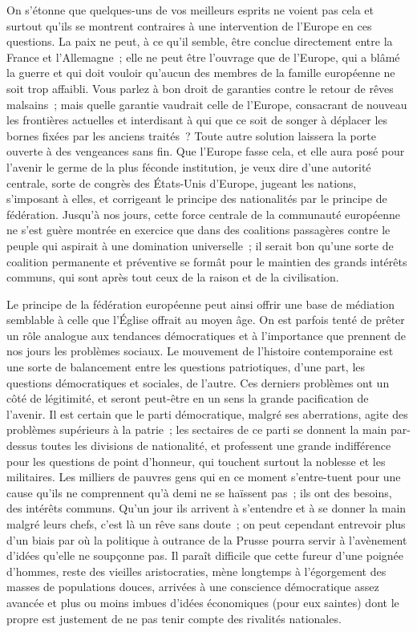 \documentclass[french,twoside]{book} %
\begin{document}
On s’étonne que quelques-uns de vos meilleurs esprits ne voient pas cela et surtout qu’ils se montrent contraires à une intervention de l’Europe en ces questions. La paix ne peut, à ce qu’il semble, être conclue directement entre la France et l’Allemagne ; elle ne peut être l’ouvrage que de l’Europe, qui a blâmé la guerre et qui doit vouloir qu’aucun des membres de la famille européenne ne soit trop affaibli. Vous parlez à bon droit de garanties contre le retour de rêves malsains ; mais quelle garantie vaudrait celle de l’Europe, consacrant de nouveau les frontières actuelles et interdisant à qui que ce soit de songer à déplacer les bornes fixées par les anciens traités ? Toute autre solution laissera la porte ouverte à des vengeances sans fin. Que l’Europe fasse cela, et elle aura posé pour l’avenir le germe de la plus féconde institution, je veux dire d’une autorité centrale, sorte de congrès des États-Unis d’Europe, jugeant les nations, s’imposant à elles, et corrigeant le principe des nationalités par le principe de fédération. Jusqu’à nos jours, cette force centrale de la communauté européenne ne s’est guère montrée en exercice que dans des coalitions passagères contre le peuple qui aspirait à une domination universelle ; il serait bon qu’une sorte de coalition permanente et préventive se formât pour le maintien des grands intérêts communs, qui sont après tout ceux de la raison et de la civilisation.\par
Le principe de la fédération européenne peut ainsi offrir une base de médiation semblable à celle que l’Église offrait au moyen âge. On est parfois tenté de prêter un rôle analogue aux tendances démocratiques et à l’importance que prennent de nos jours les problèmes sociaux. Le mouvement de l’histoire contemporaine est une sorte de balancement entre les questions patriotiques, d’une part, les questions démocratiques et sociales, de l’autre. Ces derniers problèmes ont un côté de légitimité, et seront peut-être en un sens la grande pacification de l’avenir. Il est certain que le parti démocratique, malgré ses aberrations, agite des problèmes supérieurs à la patrie ; les sectaires de ce parti se donnent la main par-dessus toutes les divisions de nationalité, et professent une grande indifférence pour les questions de point d’honneur, qui touchent surtout la noblesse et les militaires. Les milliers de pauvres gens qui en ce moment s’entre-tuent pour une cause qu’ils ne comprennent qu’à demi ne se haïssent pas ; ils ont des besoins, des intérêts communs. Qu’un jour ils arrivent à s’entendre et à se donner la main malgré leurs chefs, c’est là un rêve sans doute ; on peut cependant entrevoir plus d’un biais par où la politique à outrance de la Prusse pourra servir à l’avènement d’idées qu’elle ne soupçonne pas. Il paraît difficile que cette fureur d’une poignée d’hommes, reste des vieilles aristocraties, mène longtemps à l’égorgement des masses de populations douces, arrivées à une conscience démocratique assez avancée et plus ou moins imbues d’idées économiques (pour eux saintes) dont le propre est justement de ne pas tenir compte des rivalités nationales.\par
\end{document}
